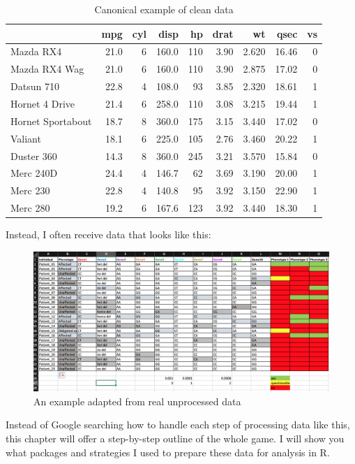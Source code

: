\documentclass[
]{book}
\begin{document}
\begin{table}

\caption{\label{tab:unnamed-chunk-6}Canonical example of clean data}
\centering
\begin{tabular}[t]{lrrrrrrrr}
\toprule
  & mpg & cyl & disp & hp & drat & wt & qsec & vs\\
\midrule
Mazda RX4 & 21.0 & 6 & 160.0 & 110 & 3.90 & 2.620 & 16.46 & 0\\
Mazda RX4 Wag & 21.0 & 6 & 160.0 & 110 & 3.90 & 2.875 & 17.02 & 0\\
Datsun 710 & 22.8 & 4 & 108.0 & 93 & 3.85 & 2.320 & 18.61 & 1\\
Hornet 4 Drive & 21.4 & 6 & 258.0 & 110 & 3.08 & 3.215 & 19.44 & 1\\
Hornet Sportabout & 18.7 & 8 & 360.0 & 175 & 3.15 & 3.440 & 17.02 & 0\\
\addlinespace
Valiant & 18.1 & 6 & 225.0 & 105 & 2.76 & 3.460 & 20.22 & 1\\
Duster 360 & 14.3 & 8 & 360.0 & 245 & 3.21 & 3.570 & 15.84 & 0\\
Merc 240D & 24.4 & 4 & 146.7 & 62 & 3.69 & 3.190 & 20.00 & 1\\
Merc 230 & 22.8 & 4 & 140.8 & 95 & 3.92 & 3.150 & 22.90 & 1\\
Merc 280 & 19.2 & 6 & 167.6 & 123 & 3.92 & 3.440 & 18.30 & 1\\
\bottomrule
\end{tabular}
\end{table}

Instead, I often receive data that looks like this:

\begin{figure}
\centering
\includegraphics{img/unprocessed_data.png}
\caption{An example adapted from real unprocessed data}
\end{figure}

Instead of Google searching how to handle each step of processing data like this, this chapter will offer a step-by-step outline of the whole game. I will show you what packages and strategies I used to prepare these data for analysis in R.
\end{document}
